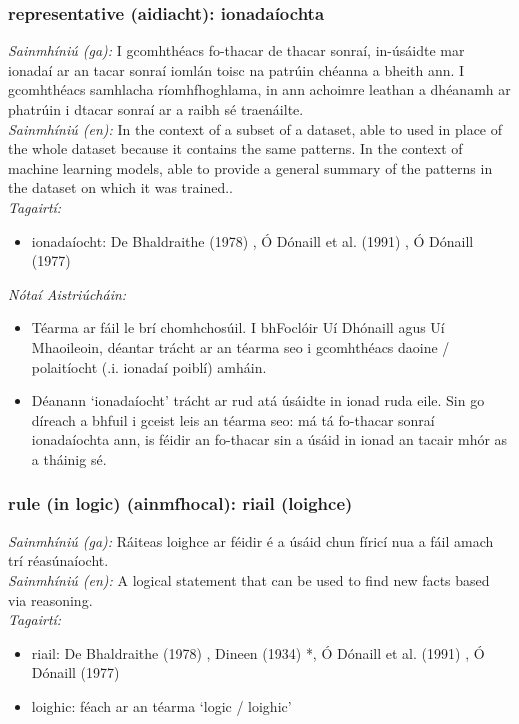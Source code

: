 \subsubsection*{representative (aidiacht): ionadaíochta}
 \noindent \textit{Sainmhíniú (ga):} I gcomhthéacs fo-thacar de thacar sonraí, in-úsáidte mar ionadaí ar an tacar sonraí iomlán toisc na patrúin chéanna a bheith ann. I gcomhthéacs samhlacha ríomhfhoghlama, in ann achoimre leathan a dhéanamh ar phatrúin i dtacar sonraí ar a raibh sé traenáilte.
\\
 \noindent \textit{Sainmhíniú (en):} In the context of a subset of a dataset, able to used in place of the whole dataset because it contains the same patterns. In the context of machine learning models, able to provide a general summary of the patterns in the dataset on which it was trained..
\\
 \noindent \textit{Tagairtí:}
\begin{itemize}
	\item ionadaíocht: De Bhaldraithe (1978) \cite{de-bhaldraithe}, Ó Dónaill et al. (1991) \cite{focloir-beag}, Ó Dónaill (1977) \cite{odonaill}
\end{itemize}

 \noindent \textit{Nótaí Aistriúcháin:}
\begin{itemize}
	\item Téarma ar fáil le brí chomhchosúil. I bhFoclóir Uí Dhónaill agus Uí Mhaoileoin, déantar trácht ar an téarma seo i gcomhthéacs daoine / polaitíocht (.i. ionadaí poiblí) amháin.
	\item Déanann `ionadaíocht' trácht ar rud atá úsáidte in ionad ruda eile. Sin go díreach a bhfuil i gceist leis an téarma seo: má tá fo-thacar sonraí ionadaíochta ann, is féidir an fo-thacar sin a úsáid in ionad an tacair mhór as a tháinig sé.
\end{itemize}


\subsubsection*{rule (in logic) (ainmfhocal): riail (loighce)}
 \noindent \textit{Sainmhíniú (ga):} Ráiteas loighce ar féidir é a úsáid chun fíricí nua a fáil amach trí réasúnaíocht.
\\
 \noindent \textit{Sainmhíniú (en):} A logical statement that can be used to find new facts based via reasoning.
\\
 \noindent \textit{Tagairtí:}
\begin{itemize}
	\item riail: De Bhaldraithe (1978) \cite{de-bhaldraithe}, Dineen (1934) \cite{dineen}*, Ó Dónaill et al. (1991) \cite{focloir-beag}, Ó Dónaill (1977) \cite{odonaill}
	\item loighic: féach ar an téarma `logic / loighic'
\end{itemize}


